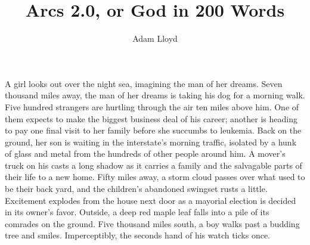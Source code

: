 \documentclass[12pt]{article}
\author{Adam Lloyd}
\title{Arcs 2.0, or God in 200 Words}
\begin{document}
\maketitle
\thispagestyle{empty}

A girl looks out over the night sea, imagining the man of her dreams.
Seven thousand miles away, the man of her dreams is taking his dog for a
morning walk.  Five hundred strangers are hurtling through the air ten
miles above him.  One of them expects to make the biggest business deal
of his career; another is heading to pay one final visit to her family
before she succumbs to leukemia.  Back on the ground, her son is waiting
in the interstate's morning traffic, isolated by a hunk of glass and
metal from the hundreds of other people around him.  A mover's truck on
his casts a long shadow as it carries a family and the salvagable parts
of their life to a new home.  Fifty miles away, a storm cloud passes
over what used to be their back yard, and the children's abandoned
swingset rusts a little.  Excitement explodes from the house next door
as a mayorial election is decided in its owner's favor.  Outside, a
deep red maple leaf falls into a pile of its comrades on the ground.
Five thousand miles south, a boy walks past a budding tree and smiles.
Imperceptibly, the seconds hand of his watch ticks once.
\end{document}
